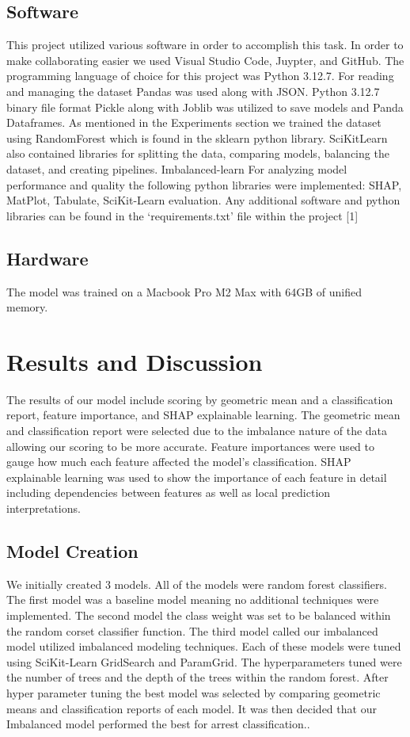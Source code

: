 \documentclass[conference]{IEEEtran}
\begin{document}
\subsection{Software}
This project utilized various software in order to accomplish this task. In order to make collaborating easier we used Visual Studio Code, Juypter, and GitHub. The programming language of choice for this project was Python 3.12.7. 
For reading and managing the dataset Pandas was used along with JSON. Python 3.12.7 binary file format Pickle along with Joblib was utilized to save models and Panda Dataframes. 
As mentioned in the Experiments section we trained the dataset using RandomForest which is found in the sklearn python library. SciKit\-Learn also contained libraries for splitting the data, comparing models, balancing the dataset, and creating pipelines. Imbalanced-learn
For analyzing model performance and quality the following python libraries were implemented: SHAP, MatPlot, Tabulate, SciKit-Learn evaluation.
Any additional software and python libraries can be found in the ‘requirements.txt’ file within the project [1]
\subsection{Hardware}
The model was trained on a Macbook Pro M2 Max with 64GB of unified memory. 
\section{Results and Discussion}
The results of our model include scoring by geometric mean and a classification report, feature importance, and SHAP explainable learning. The geometric mean and classification report were selected due to the imbalance nature of the data allowing our scoring to be more accurate. Feature importances were used to gauge how much each feature affected the model's classification. SHAP explainable learning was used to show the importance of each feature in detail including dependencies between features as well as local prediction interpretations.

\subsection{Model Creation}
We initially created 3 models. All of the models were random forest classifiers. The first model was a baseline model meaning no additional techniques were implemented. The second model the class weight was set to be balanced within the random corset classifier function. The third model called our imbalanced model utilized imbalanced modeling techniques. Each of these models were tuned using SciKit-Learn GridSearch and ParamGrid. The hyperparameters tuned were the number of trees and the depth of the trees within the random forest. After hyper parameter tuning the best model was selected by comparing geometric means and classification reports of each model. It was then decided that our Imbalanced model performed the best for arrest classification.. 
\end{document}
